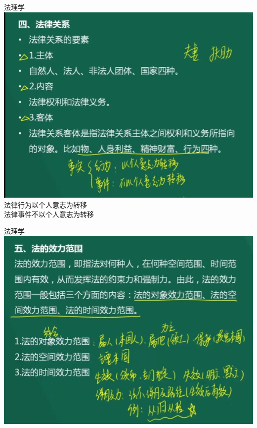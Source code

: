 \documentclass[aspectratio=169]{beamer}
\begin{document}
\begin{frame}[t]{法理学}
    \includegraphics[scale=0.5]{law_element}\\ 
    法律行为以个人意志为转移\\
    法律事件不以个人意志为转移
\end{frame}

\begin{frame}[t]{法理学}
    \includegraphics[scale=0.5]{law_range}\\ 
\end{frame}
\end{document}
